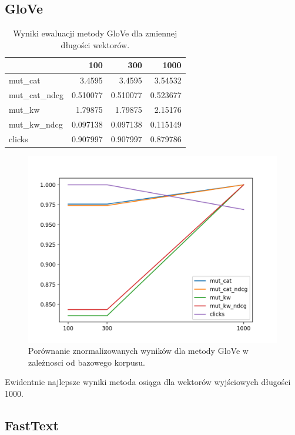 \documentclass[pl]{minipw} %
\begin{document}
\subsection{GloVe}

\begin{table}
	\centering
	\begin{tabular}{lrrr}
		\hline
		&      100 &      300 &     1000 \\
		\hline
		mut\_cat      & 3.4595   & 3.4595   & 3.54532  \\
		mut\_cat\_ndcg & 0.510077 & 0.510077 & 0.523677 \\
		mut\_kw       & 1.79875  & 1.79875  & 2.15176  \\
		mut\_kw\_ndcg  & 0.097138 & 0.097138 & 0.115149 \\
		clicks       & 0.907997 & 0.907997 & 0.879786 \\
		\hline
	\end{tabular}
	\caption{Wyniki ewaluacji metody GloVe dla zmiennej długości wektorów.}
\end{table}

\begin{figure}[H]
	\centering
	\includegraphics[width=1\textwidth]{img/results/gv_ctr.png}
	\caption{Porównanie znormalizowanych wyników dla metody GloVe w zależnosci od bazowego korpusu.}
\end{figure}

Ewidentnie najlepsze wyniki metoda osiąga dla wektorów wyjściowych długości 1000.

\subsection{FastText}
\end{document}
